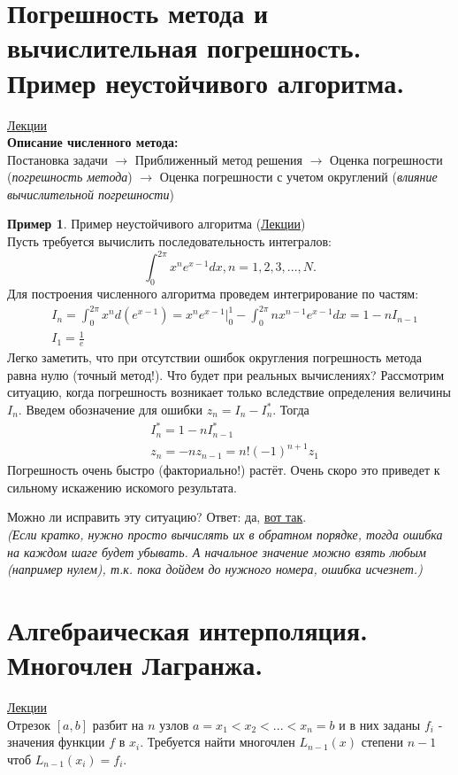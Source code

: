 \documentclass[specialist, subf, href, colorlinks=true, 12pt, times, mtpro, final]{disser}
\theoremstyle{definition}
\newtheorem{example}{Пример}[section]
\begin{document}
\tableofcontents

\section {Погрешность метода и вычислительная погрешность. Пример неустойчивого алгоритма.}
    \hyperlink {lects.1}{Лекции} \\
    \textbf{Описание численного метода:}\\
    Постановка задачи $\rightarrow$ Приближенный метод решения $\rightarrow$ Оценка погрешности (\textit{погрешность метода}) $\rightarrow$ Оценка погрешности с учетом округлений (\textit{влияние вычислительной погрешности})  

	\begin{example}
    	Пример неустойчивого алгоритма (\hyperlink {lects.14}{Лекции})\\
    	Пусть требуется вычислить последовательность интегралов:
    	$$
    	    \int_0^{2\pi}{x^n e^{x-1}dx}, n = 1,2,3,...,N.
    	$$
    	Для построения численного алгоритма проведем интегрирование по частям:
    	$$
    	\begin{aligned}
    	    & I_n = \int_0^{2\pi}{x^n d(e^{x-1})} = x^n e^{x-1} \big|_0^1 - \int_0^{2\pi}{n x^{n-1} e^{x-1}dx} = 1 - n 	I_{n-1} \\
        	& I_1 = \frac{1}{e}
    	\end{aligned}
    	$$
    	Легко заметить, что при отсутствии ошибок округления погрешность метода равна нулю (точный метод!). Что будет при реальных вычислениях? Рассмотрим ситуацию, когда погрешность возникает только вследствие определения величины $I_n$. Введем обозначение для ошибки $z_n = I_n - I_n^*$. Тогда
    	$$
    	\begin{aligned}
    	    & I_n^* = 1 - n I_{n-1}^* \\
        	& z_n = - n z_{n-1} = n! (-1)^{n+1} z_1
    	\end{aligned}
    	$$
    	Погрешность очень быстро (факториально!) растёт. Очень скоро это приведет к сильному искажению искомого результата.
	\end{example}
	\noindent Можно ли исправить эту ситуацию? Ответ: да, \hyperlink {lects.15}{вот так}.\\
	{\it(Если кратко, нужно просто вычислять их в обратном
	порядке, тогда ошибка на каждом шаге будет убывать. А начальное значение можно взять
	любым (например нулем), т.к. пока дойдем до нужного номера, ошибка исчезнет.)}

\section {Алгебраическая интерполяция. Многочлен Лагранжа.}
	\hyperlink {lects.15}{Лекции}\\
	Отрезок $[a,b]$ разбит на $n$ узлов $a = x_1 < x_2 < ... < x_n = b$ и в них заданы $f_i$ - значения функции $f$ в $x_i$. Требуется найти многочлен $L_{n-1}(x)$ степени $n - 1$ чтоб $L_{n - 1}(x_i) = f_i$.
\end{document}
